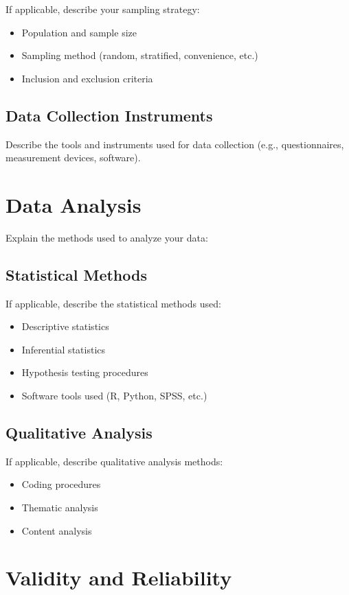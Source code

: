 If applicable, describe your sampling strategy:
\begin{itemize}
    \item Population and sample size
    \item Sampling method (random, stratified, convenience, etc.)
    \item Inclusion and exclusion criteria
\end{itemize}

\subsection{Data Collection Instruments}

Describe the tools and instruments used for data collection (e.g., questionnaires, measurement devices, software).

\section{Data Analysis}

Explain the methods used to analyze your data:

\subsection{Statistical Methods}

If applicable, describe the statistical methods used:
\begin{itemize}
    \item Descriptive statistics
    \item Inferential statistics
    \item Hypothesis testing procedures
    \item Software tools used (R, Python, SPSS, etc.)
\end{itemize}

\subsection{Qualitative Analysis}

If applicable, describe qualitative analysis methods:
\begin{itemize}
    \item Coding procedures
    \item Thematic analysis
    \item Content analysis
\end{itemize}

\section{Validity and Reliability}

